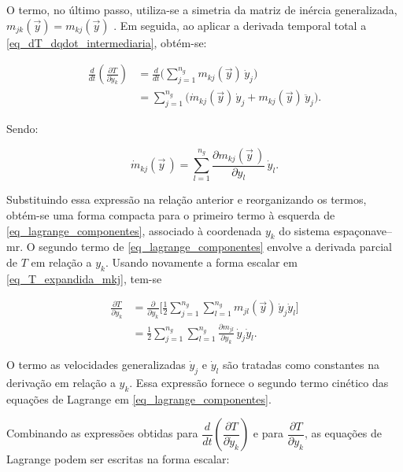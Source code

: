 O termo, no último passo, utiliza-se a simetria da matriz de inércia generalizada, $m_{jk}(\vec y) = m_{kj}(\vec y)$ \cite{Geradin2004}.
Em seguida, ao aplicar a derivada temporal total a \eqref{eq_dT_dqdot_intermediaria}, obtém-se:

\begin{equation}
\begin{aligned}
\frac{d}{dt}\!\left(\frac{\partial T}{\partial \dot y_k}\right)
&=
\frac{d}{dt}
\biggl(
\sum_{j=1}^{n_g}
m_{kj}(\vec y)\,\dot y_j
\biggr)
\\
&=
\sum_{j=1}^{n_g}
\bigl(
\dot m_{kj}(\vec y)\,\dot y_j
+
m_{kj}(\vec y)\,\ddot y_j
\bigr).
\end{aligned}
\end{equation}

Sendo:

\begin{equation}
\dot m_{kj}(\vec y\,)
=
\sum_{l=1}^{n_g}
\frac{\partial m_{kj}(\vec y\,)}{\partial y_l}\,\dot y_l.
\end{equation}


Substituindo essa expressão na relação anterior e reorganizando os termos, obtém-se uma forma compacta para o primeiro termo à esquerda de \eqref{eq_lagrange_componentes},
associado à coordenada $y_k$ do sistema espaçonave--\gls{mr}.
O segundo termo de \eqref{eq_lagrange_componentes} envolve a derivada parcial de $T$ em relação a $y_k$.
Usando novamente a forma escalar em \eqref{eq_T_expandida_mkj}, tem-se

\begin{equation}
\begin{aligned}
\frac{\partial T}{\partial y_k}
&=
\frac{\partial}{\partial y_k}
\biggl[
\frac{1}{2}
\sum_{j=1}^{n_g}\sum_{l=1}^{n_g}
m_{jl}(\vec y)\,\dot y_j \dot y_l
\biggr]
\\
&=
\frac{1}{2}
\sum_{j=1}^{n_g}\sum_{l=1}^{n_g}
\frac{\partial m_{jl}}{\partial y_k}\,\dot y_j \dot y_l.
\end{aligned}
\end{equation}

O termo as velocidades generalizadas $\dot y_j$ e $\dot y_l$ são tratadas como constantes na derivação em relação a $y_k$.
Essa expressão fornece o segundo termo cinético das equações de Lagrange em \eqref{eq_lagrange_componentes}.



Combinando as expressões obtidas para $\dfrac{d}{dt}\!\left(\dfrac{\partial T}{\partial \dot y_k}\right)$
e para $\dfrac{\partial T}{\partial y_k}$, as equações de Lagrange podem ser escritas na forma escalar:

